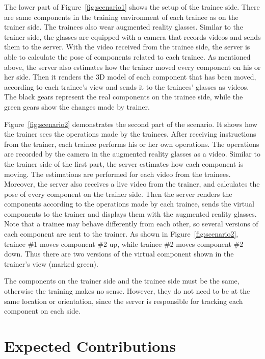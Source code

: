 The lower part of Figure~\ref{fig:scenario1} shows the setup of the trainee side.
There are same components in the training environment of each trainee as on the trainer side.
The trainees also wear augmented reality glasses.
Similar to the trainer side, the glasses are equipped with a camera that records videos and sends them to the server. With the video received from the trainee side, the server is able to calculate the pose of components related to each trainee.
As mentioned above, the server also estimates how the trainer moved every component on his or her side. Then it renders the 3D model of each component that has been moved, according to each trainee's view and sends it to the trainees' glasses as videos.
The black gears represent the real components on the trainee side, while the green gears show the changes made by trainer.

Figure~\ref{fig:scenario2} demonstrates the second part of the scenario. It shows how the trainer sees the operations made by the trainees.
After receiving instructions from the trainer, each trainee performs his or her own operations. The operations are recorded by the camera in the augmented reality glasses as a video.
Similar to the trainer side of the first part, the server estimates how each component is moving. The estimations are performed for each video from the trainees.
Moreover, the server also receives a live video from the trainer, and calculates the pose of every component on the trainer side.
Then the server renders the components according to the operations made by each trainee, sends the virtual components to the trainer and displays them with the augmented reality glasses.
Note that a trainee may behave differently from each other, so several versions of each component are sent to the trainer. As shown in Figure~\ref{fig:scenario2}, trainee \#1 moves component \#2 up, while trainee \#2 moves component \#2 down. Thus there are two versions of the virtual component shown in the trainer's view (marked green).

The components on the trainer side and the trainee side must be the same, otherwise the training makes no sense. However, they do not need to be at the same location or orientation, since the server is responsible for tracking each component on each side.

\section{Expected Contributions}
\label{sec:i:ec}

